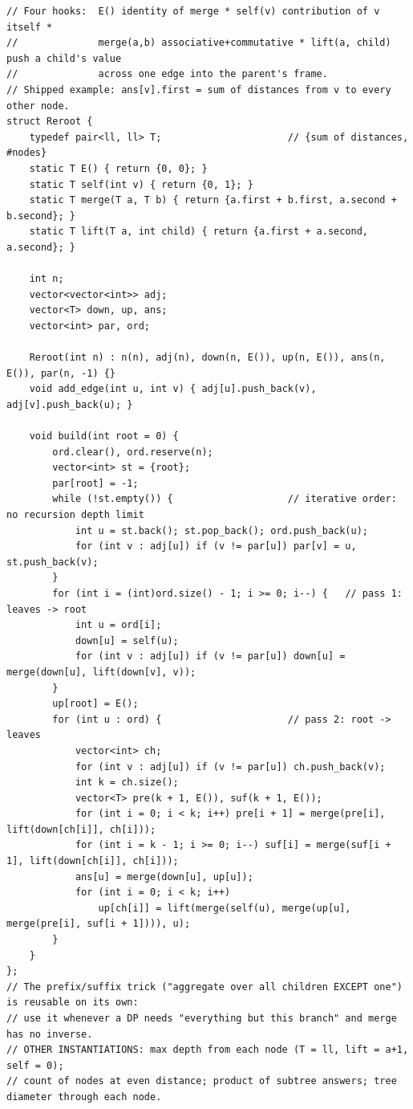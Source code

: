 \documentclass[9pt,a4paper,twocolumn]{extarticle}
\begin{document}
\begin{lstlisting}
// Four hooks:  E() identity of merge * self(v) contribution of v itself *
//              merge(a,b) associative+commutative * lift(a, child) push a child's value
//              across one edge into the parent's frame.
// Shipped example: ans[v].first = sum of distances from v to every other node.
struct Reroot {
    typedef pair<ll, ll> T;                      // {sum of distances, #nodes}
    static T E() { return {0, 0}; }
    static T self(int v) { return {0, 1}; }
    static T merge(T a, T b) { return {a.first + b.first, a.second + b.second}; }
    static T lift(T a, int child) { return {a.first + a.second, a.second}; }

    int n;
    vector<vector<int>> adj;
    vector<T> down, up, ans;
    vector<int> par, ord;

    Reroot(int n) : n(n), adj(n), down(n, E()), up(n, E()), ans(n, E()), par(n, -1) {}
    void add_edge(int u, int v) { adj[u].push_back(v), adj[v].push_back(u); }

    void build(int root = 0) {
        ord.clear(), ord.reserve(n);
        vector<int> st = {root};
        par[root] = -1;
        while (!st.empty()) {                    // iterative order: no recursion depth limit
            int u = st.back(); st.pop_back(); ord.push_back(u);
            for (int v : adj[u]) if (v != par[u]) par[v] = u, st.push_back(v);
        }
        for (int i = (int)ord.size() - 1; i >= 0; i--) {   // pass 1: leaves -> root
            int u = ord[i];
            down[u] = self(u);
            for (int v : adj[u]) if (v != par[u]) down[u] = merge(down[u], lift(down[v], v));
        }
        up[root] = E();
        for (int u : ord) {                      // pass 2: root -> leaves
            vector<int> ch;
            for (int v : adj[u]) if (v != par[u]) ch.push_back(v);
            int k = ch.size();
            vector<T> pre(k + 1, E()), suf(k + 1, E());
            for (int i = 0; i < k; i++) pre[i + 1] = merge(pre[i], lift(down[ch[i]], ch[i]));
            for (int i = k - 1; i >= 0; i--) suf[i] = merge(suf[i + 1], lift(down[ch[i]], ch[i]));
            ans[u] = merge(down[u], up[u]);
            for (int i = 0; i < k; i++)
                up[ch[i]] = lift(merge(self(u), merge(up[u], merge(pre[i], suf[i + 1]))), u);
        }
    }
};
// The prefix/suffix trick ("aggregate over all children EXCEPT one") is reusable on its own:
// use it whenever a DP needs "everything but this branch" and merge has no inverse.
// OTHER INSTANTIATIONS: max depth from each node (T = ll, lift = a+1, self = 0);
// count of nodes at even distance; product of subtree answers; tree diameter through each node.
\end{lstlisting}
\end{document}
